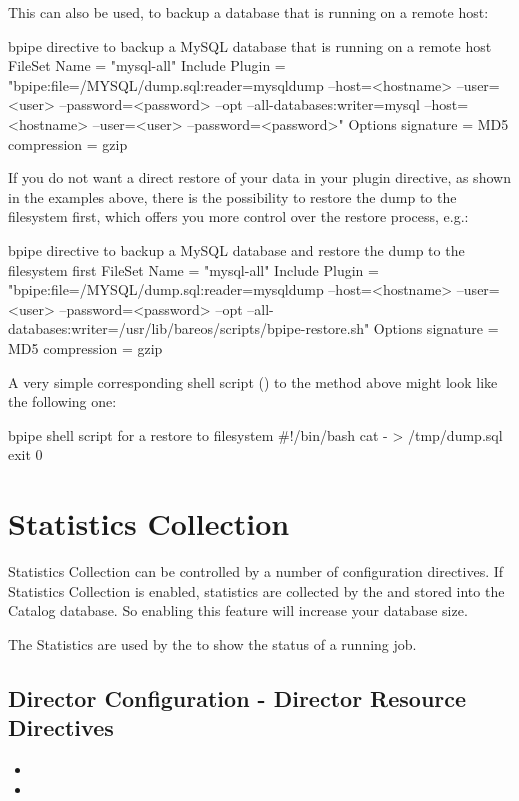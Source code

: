 This can also be used, to backup a database that is running on a remote host:
\begin{bconfig}{bpipe directive to backup a MySQL database that is running on a remote host}
FileSet{
  Name = "mysql-all"
  Include {
    Plugin = "bpipe:file=/MYSQL/dump.sql:reader=mysqldump --host=<hostname> --user=<user> --password=<password> --opt --all-databases:writer=mysql --host=<hostname> --user=<user> --password=<password>"
    Options {
      signature = MD5
      compression = gzip
    }
  }
}
\end{bconfig}

If you do not want a direct restore of your data in your plugin directive, as shown in the examples above, 
there is the possibility to restore the dump to the filesystem first, which offers you more control over the restore process, e.g.:
\begin{bconfig}{bpipe directive to backup a MySQL database and restore the dump to the filesystem first}
FileSet{
  Name = "mysql-all"
  Include {
    Plugin = "bpipe:file=/MYSQL/dump.sql:reader=mysqldump --host=<hostname> --user=<user> --password=<password> --opt --all-databases:writer=/usr/lib/bareos/scripts/bpipe-restore.sh"
    Options {
      signature = MD5
      compression = gzip
    }
  }
}
\end{bconfig}

A very simple corresponding shell script () to the method above might look like the following one:
\begin{bconfig}{bpipe shell script for a restore to filesystem}
#!/bin/bash
cat - > /tmp/dump.sql
exit 0
\end{bconfig}

\section{Statistics Collection}
\label{sec:StatisticCollection}

Statistics Collection can be controlled by a number of configuration directives.
If Statistics Collection is enabled, statistics are collected by the \bareosDir and stored into the Catalog database.
So enabling this feature will increase your database size.

The Statistics are used by the \bareosWebui to show the status of a running job.

\subsection{Director Configuration - Director Resource Directives}
\begin{itemize}
  \item {}
  \item {}
\end{itemize}

